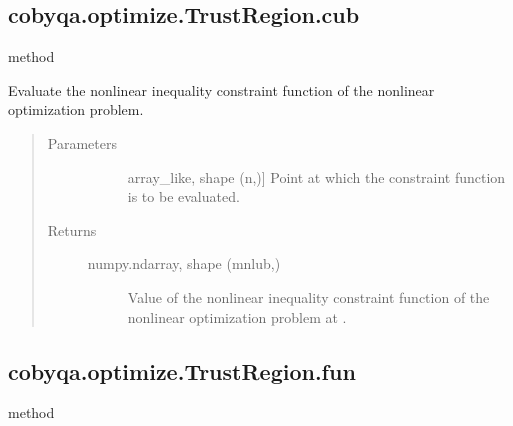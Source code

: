 \documentclass[letterpaper,10pt,english]{sphinxmanual}
\begin{document}
\begin{fulllineitems}
\begin{fulllineitems}
\end{fulllineitems}



\subsection{cobyqa.optimize.TrustRegion.cub}
\label{\detokenize{refs/generated/cobyqa.optimize.TrustRegion.cub:cobyqa-optimize-trustregion-cub}}\label{\detokenize{refs/generated/cobyqa.optimize.TrustRegion.cub::doc}}
\sphinxAtStartPar
method

\begin{fulllineitems}
\label{\detokenize{refs/generated/cobyqa.optimize.TrustRegion.cub:cobyqa.optimize.TrustRegion.cub}}
\sphinxAtStartPar
Evaluate the nonlinear inequality constraint function of the nonlinear
optimization problem.
\begin{quote}\begin{description}
\item[{Parameters}] \leavevmode\begin{description}
\item[{}] \leavevmode{[}array\_like, shape (n,){]}
\sphinxAtStartPar
Point at which the constraint function is to be evaluated.

\end{description}

\item[{Returns}] \leavevmode\begin{description}
\item[{numpy.ndarray, shape (mnlub,)}] \leavevmode
\sphinxAtStartPar
Value of the nonlinear inequality constraint function of the
nonlinear optimization problem at .

\end{description}

\end{description}\end{quote}

\end{fulllineitems}



\subsection{cobyqa.optimize.TrustRegion.fun}
\label{\detokenize{refs/generated/cobyqa.optimize.TrustRegion.fun:cobyqa-optimize-trustregion-fun}}\label{\detokenize{refs/generated/cobyqa.optimize.TrustRegion.fun::doc}}
\sphinxAtStartPar
method


\end{fulllineitems}
\end{document}

